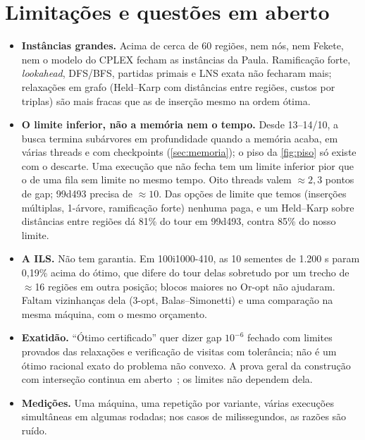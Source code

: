 \documentclass[11pt,a4paper]{article}
\theoremstyle{plain}\newtheorem{proposicao}{Proposição}
\theoremstyle{definition}\newtheorem{definicao}{Definição}
\theoremstyle{plain}\newtheorem{teorema}{Teorema}
\theoremstyle{plain}\newtheorem{lema}{Lema}
\begin{document}
\section{Limitações e questões em aberto}\label{sec:limites}
\begin{itemize}[leftmargin=*,itemsep=2pt]
\item \textbf{Instâncias grandes.} Acima de cerca de 60 regiões, nem nós, nem Fekete, nem o modelo do CPLEX fecham as instâncias da Paula. Ramificação forte, \emph{lookahead}, DFS/BFS, partidas primais e LNS exata não fecharam mais; relaxações em grafo (Held--Karp com distâncias entre regiões, custos por triplas) são mais fracas que as de inserção mesmo na ordem ótima.
\item \textbf{O limite inferior, não a memória nem o tempo.} Desde 13--14/10, a busca termina subárvores em profundidade quando a memória acaba, em várias threads e com checkpoints (\cref{sec:memoria}); o piso da \cref{fig:piso} só existe com o descarte. Uma execução que não fecha tem um limite inferior pior que o de uma fila sem limite no mesmo tempo. Oito threads valem \(\approx 2{,}3\) pontos de gap; 99d493 precisa de \(\approx 10\). Das opções de limite que temos (inserções múltiplas, 1-árvore, ramificação forte) nenhuma paga, e um Held--Karp sobre distâncias entre regiões dá 81\% do tour em 99d493, contra 85\% do nosso limite.
\item \textbf{A ILS.} Não tem garantia. Em 100i1000-410, as 10 sementes de 1.200 s param 0,19\% acima do ótimo, que difere do tour delas sobretudo por um trecho de \(\approx\)16 regiões em outra posição; blocos maiores no Or-opt não ajudaram. Faltam vizinhanças dela (3-opt, Balas--Simonetti) e uma comparação na mesma máquina, com o mesmo orçamento.
\item \textbf{Exatidão.} ``Ótimo certificado'' quer dizer gap \(10^{-6}\) fechado com limites provados das relaxações e verificação de visitas com tolerância; não é um ótimo racional exato do problema não convexo. A prova geral da construção com interseção continua em aberto~\cite{tutorial}; os limites não dependem dela.
\item \textbf{Medições.} Uma máquina, uma repetição por variante, várias execuções simultâneas em algumas rodadas; nos casos de milissegundos, as razões são ruído.
\end{itemize}

\appendix
\end{document}
